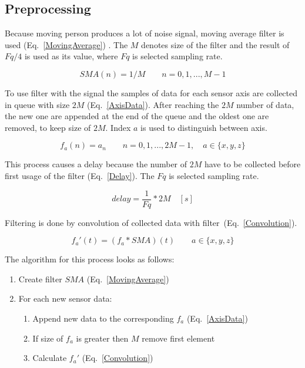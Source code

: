 \documentclass[conference]{IEEEtran}
\begin{document}
\subsection{Preprocessing}
Because moving person produces a lot of noise signal, moving average filter is used (Eq.~\ref{MovingAverage}) \cite{MovingAverage}.
The $M$ denotes size of the filter and the result of $Fq/4$ is used as its value, where $Fq$ is selected sampling rate.

\begin{equation}
	SMA(n) = 1/M\qquad  n = 0, 1, ..., M - 1
	\label{MovingAverage}
\end{equation}

To use filter with the signal the samples of data for each sensor axis are collected in queue with size  $2M$ (Eq.~\ref{AxisData}).
After reaching the $2M$ number of data, the new one are appended at the end of the queue and the oldest one are removed, to keep size of $2M$.
Index $a$ is used to distinguish between axis.

\begin{equation}
    f_a(n) = a_n\qquad n = 0, 1, ..., 2M - 1,\quad a \in \{x, y, z\}
    \label{AxisData}
\end{equation}

This process causes a delay because the number of $2M$ have to be collected before first usage of the filter (Eq.~\ref{Delay}). The $Fq$ is selected sampling rate.

\begin{equation}
    delay = \frac{1}{Fq} * 2M\quad[s]
    \label{Delay}
\end{equation}

Filtering is done by convolution of collected data with filter~(Eq.~\ref{Convolution}).

\begin{equation}
    f_a'(t) = (f_a \ast SMA)(t) \qquad a \in \{x, y, z\}
    \label{Convolution}
\end{equation}

The algorithm for this process looks as follows:
\begin{enumerate}
    \item Create filter $SMA$ (Eq.~\ref{MovingAverage})
    \item For each new sensor data:
    \begin{enumerate}
        \item Append new data to the corresponding $f_a$ (Eq.~\ref{AxisData})
        \item If size of $f_a$ is greater then $M$ remove first element
        \item Calculate $f_a'$ (Eq.~\ref{Convolution})
    \end{enumerate}
\end{enumerate}
\end{document}
